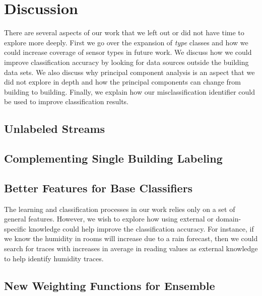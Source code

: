 \section{Discussion}
There are several aspects of our work that we left out or did not have time to explore more deeply.
First we go over the expansion of \emph{type} classes and how we could increase coverage of sensor types in future work. 
We discuss how we could improve classification accuracy
by looking for data sources outside the building data sets. We also discuss why principal component analysis is an aspect that we
did not explore in depth and how the principal components can change from building to building.  Finally, we 
explain how our misclassification identifier could be used to improve classification results.

\subsection{Unlabeled Streams}

\subsection{Complementing Single Building Labeling}

\subsection{Better Features for Base Classifiers}
The learning and classification processes in our work relies only on a set of general features. However, we wish to explore how using external or domain-specific knowledge could help improve the classification accuracy. For instance, if we know the humidity in rooms will increase due to a rain forecast, then we could search for traces with increases in average in reading values as external knowledge to help identify humidity traces. 

\subsection{New Weighting Functions for Ensemble}


